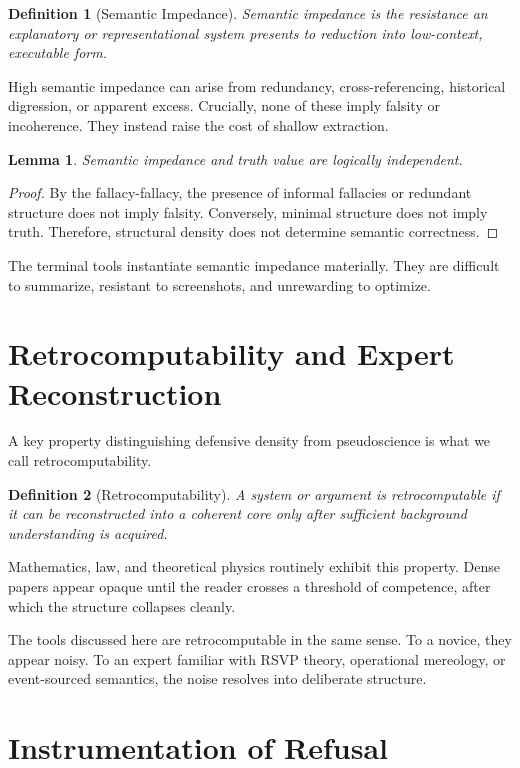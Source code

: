 \documentclass[11pt]{article}
\newtheorem{definition}{Definition}
\newtheorem{lemma}{Lemma}
\begin{document}
\begin{definition}[Semantic Impedance]
Semantic impedance is the resistance an explanatory or representational system
presents to reduction into low-context, executable form.
\end{definition}

High semantic impedance can arise from redundancy, cross-referencing, historical
digression, or apparent excess. Crucially, none of these imply falsity or
incoherence. They instead raise the cost of shallow extraction.

\begin{lemma}
Semantic impedance and truth value are logically independent.
\end{lemma}

\begin{proof}
By the fallacy-fallacy, the presence of informal fallacies or redundant structure
does not imply falsity. Conversely, minimal structure does not imply truth.
Therefore, structural density does not determine semantic correctness.
\end{proof}

The terminal tools instantiate semantic impedance materially. They are difficult
to summarize, resistant to screenshots, and unrewarding to optimize.

\section{Retrocomputability and Expert Reconstruction}

A key property distinguishing defensive density from pseudoscience is what we
call retrocomputability.

\begin{definition}[Retrocomputability]
A system or argument is retrocomputable if it can be reconstructed into a
coherent core only after sufficient background understanding is acquired.
\end{definition}

Mathematics, law, and theoretical physics routinely exhibit this property. Dense
papers appear opaque until the reader crosses a threshold of competence, after
which the structure collapses cleanly.

The tools discussed here are retrocomputable in the same sense. To a novice,
they appear noisy. To an expert familiar with RSVP theory, operational
mereology, or event-sourced semantics, the noise resolves into deliberate
structure.

\section{Instrumentation of Refusal}
\end{document}
